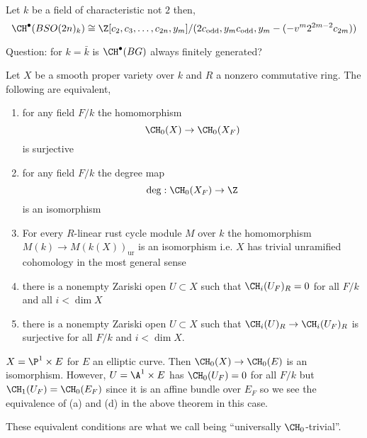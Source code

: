 \documentclass{article}
\begin{document}
\begin{example}
Let $k$ be a field of characteristic not $2$ then,
\[ \CH^\bullet(BSO(2n)_k) \cong \Z[c_2, c_3, \dots, c_{2n}, y_m]/(2 c_{\text{odd}}, y_m c_{\text{odd}}, y_m - (-v^m 2^{2m-2} c_{2m})) \]
\end{example}

Question: for $k = \bar{k}$ is $\CH^\bullet(BG)$ always finitely generated? 

\newcommand{\ur}{\mathrm{ur}}

\begin{theorem}[T, 2016]
Let $X$ be a smooth proper variety over $k$ and $R$ a nonzero commutative ring. The following are equivalent,
\begin{enumerate}
\item for any field $F / k$ the homomorphism 
\[ \CH_0(X) \to \CH_0(X_F) \]
is surjective
\item for any field $F / k$ the degree map
\[ \deg : \CH_0(X_F) \to \Z \]
is an isomorphism
\item For every $R$-linear rust cycle module $M$ over $k$ the homomorphism $M(k) \to M(k(X))_{\ur}$ is an isomorphism i.e. $X$ has trivial unramified cohomology in the most general sense
\item there is a nonempty Zariski open $U \subset X$ such that $\CH_i(U_F)_R = 0$ for all $F/k$ and all $i < \dim{X}$
\item there is a nonempty Zariski open $U \subset X$ such that $\CH_i(U)_R \to \CH_i(U_F)_R$ is surjective for all $F/k$ and $i < \dim{X}$. 
\end{enumerate}
\end{theorem}

\begin{example}
$X = \P^1 \times E$ for $E$ an elliptic curve. Then $\CH_0(X) \to \CH_0(E)$ is an isomorphism. However, $U = \A^1 \times E$ has $\CH_0(U_F) = 0$ for all $F / k$ but $\CH_1(U_F) = \CH_0(E_F)$ since it is an affine bundle over $E_F$ so we see the equivalence of (a) and (d) in the above theorem in this case.
\end{example}

\begin{rmk}
These equivalent conditions are what we call being ``universally $\CH_0$-trivial''. 
\end{rmk}
\end{document}
